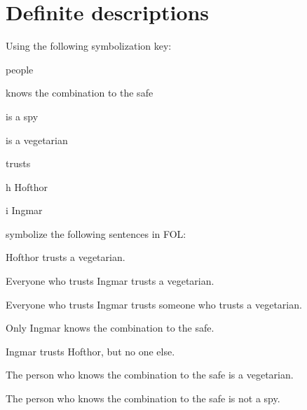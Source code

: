 \chapter{Definite descriptions}\setcounter{ProbPart}{0}
\problempart
Using the following symbolization key:
\begin{ekey}
\item[\text{domain}] people
\item[\atom{K}{x}]  knows the combination to the safe
\item[\atom{S}{x}]  is a spy
\item[\atom{V}{x}]  is a vegetarian
\item[\atom{T}{x,y}]  trusts 
\item[h] Hofthor
\item[i] Ingmar
\end{ekey}
symbolize the following sentences in FOL:
\begin{compactlist}
\item Hofthor trusts a vegetarian.
\item[] 
\item Everyone who trusts Ingmar trusts a vegetarian.
\item[] 
\item Everyone who trusts Ingmar trusts someone who trusts a vegetarian.
\item[] 
\item Only Ingmar knows the combination to the safe.
\item[] 
\item Ingmar trusts Hofthor, but no one else.
\item[] 
\item The person who knows the combination to the safe is a vegetarian.
\item[] 
\item The person who knows the combination to the safe is not a spy.
\item[] 
\end{compactlist}


